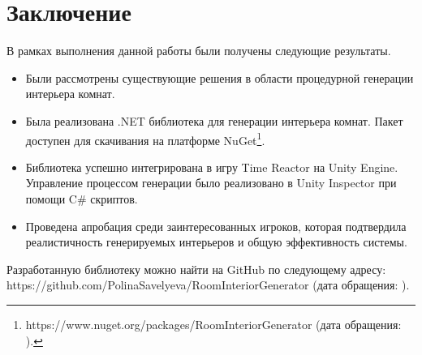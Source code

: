 
\section{Заключение}

В рамках выполнения данной работы были получены следующие результаты.

\begin{itemize}
\item Были рассмотрены существующие решения в области процедурной генерации интерьера комнат.

\item Была реализована .NET библиотека для генерации интерьера комнат. Пакет доступен для скачивания на платформе NuGet\footnote{https://www.nuget.org/packages/RoomInteriorGenerator (дата обращения: ).}.

\item Библиотека успешно интегрирована в игру Ti\-me Re\-ac\-tor на Uni\-ty En\-gi\-ne. Управление процессом генерации было реализовано в Uni\-ty Ins\-pec\-tor при помощи C\# скриптов.

\item Проведена апробация среди заинтересованных игроков, которая подтвердила реалистичность генерируемых интерьеров и общую эффективность системы.

\end{itemize}

Разработанную библиотеку можно найти на GitHub по следующему адресу: https://git\-hub.com/PolinaSavelyeva/RoomInteriorGenerator (дата обращения: ).